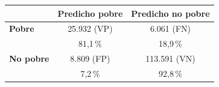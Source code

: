\begin{tabular}{lcc}
\toprule
 & \textbf{Predicho pobre} & \textbf{Predicho no pobre} \\
\midrule
\textbf{Pobre} & 25.932 (VP) & 6.061 (FN) \\
 & {\footnotesize 81,1\,\%} & {\footnotesize 18,9\,\%} \\
\textbf{No pobre} & 8.809 (FP) & 113.591 (VN) \\
 & {\footnotesize 7,2\,\%} & {\footnotesize 92,8\,\%} \\
\bottomrule
\end{tabular}
